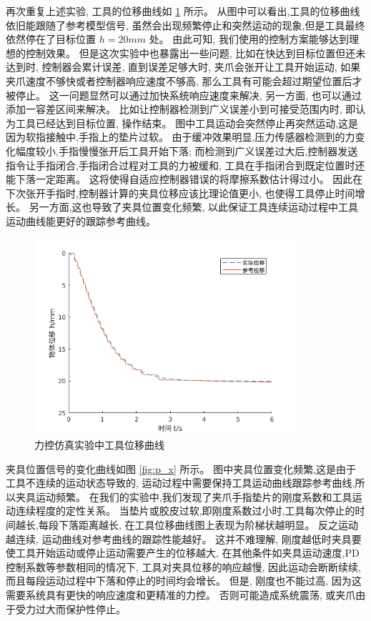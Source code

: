 再次重复上述实验, 工具的位移曲线如 \ref{fig:h_x} 所示。
从图中可以看出,工具的位移曲线依旧能跟随了参考模型信号,
虽然会出现频繁停止和突然运动的现象,但是工具最终依然停在了目标位置 $h = 20 mm$ 处。
由此可知, 我们使用的控制方案能够达到理想的控制效果。
但是这次实验中也暴露出一些问题, 比如在快达到目标位置但还未达到时,
控制器会累计误差, 直到误差足够大时, 夹爪会张开让工具开始运动,
如果夹爪速度不够快或者控制器响应速度不够高, 那么工具有可能会超过期望位置后才被停止。
这一问题显然可以通过加快系统响应速度来解决, 另一方面, 也可以通过添加一容差区间来解决。
比如让控制器检测到广义误差小到可接受范围内时, 即认为工具已经达到目标位置, 操作结束。
图中工具运动会突然停止再突然运动,这是因为软指接触中,手指上的垫片过软。
由于缓冲效果明显,压力传感器检测到的力变化幅度较小,手指慢慢张开后工具开始下落;
而检测到广义误差过大后,控制器发送指令让手指闭合,手指闭合过程对工具的力被缓和,
工具在手指闭合到既定位置时还能下落一定距离。
这将使得自适应控制器错误的将摩擦系数估计得过小。
因此在下次张开手指时,控制器计算的夹具位移应该比理论值更小, 也使得工具停止时间增长。
另一方面,这也导致了夹具位置变化频繁,
以此保证工具连续运动过程中工具运动曲线能更好的跟踪参考曲线。

\begin{figure}[!ht]
  \centering
  \includegraphics[width=9.7cm]{chapter04/pic/h_x}
  \caption{\label{fig:h_x}
    力控仿真实验中工具位移曲线}
  \vspace{-0.3cm}
\end{figure}


夹具位置信号的变化曲线如图 \ref{fig:p_x} 所示。
图中夹具位置变化频繁,这是由于工具不连续的运动状态导致的,
运动过程中需要保持工具运动曲线跟踪参考曲线,所以夹具运动频繁。
在我们的实验中,我们发现了夹爪手指垫片的刚度系数和工具运动连续程度的定性关系。
当垫片或胶皮过软,即刚度系数过小时,工具每次停止的时间越长,每段下落距离越长,
在工具位移曲线图上表现为阶梯状越明显。
反之运动越连续, 运动曲线对参考曲线的跟踪性能越好。
这并不难理解, 刚度越低时夹具要使工具开始运动或停止运动需要产生的位移越大,
在其他条件如夹具运动速度,PD控制系数等参数相同的情况下, 工具对夹具位移的响应越慢,
因此运动会断断续续, 而且每段运动过程中下落和停止的时间均会增长。
但是, 刚度也不能过高, 因为这需要系统具有更快的响应速度和更精准的力控。
否则可能造成系统震荡, 或夹爪由于受力过大而保护性停止。

